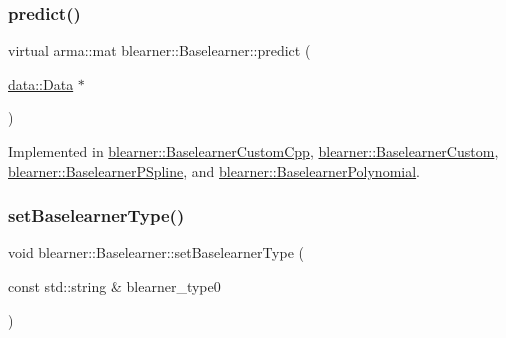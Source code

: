 \subsubsection{\texorpdfstring{predict()}{predict()}\hspace{0.1cm}{\footnotesize\ttfamily [2/2]}}
{\footnotesize\ttfamily virtual arma\+::mat blearner\+::\+Baselearner\+::predict (\begin{DoxyParamCaption}\item[{\hyperlink{classdata_1_1_data}{data\+::\+Data} $\ast$}]{ }\end{DoxyParamCaption})\hspace{0.3cm}{\ttfamily [pure virtual]}}



Implemented in \hyperlink{classblearner_1_1_baselearner_custom_cpp_a55fb45a929fea01f79fa3dcad7698174}{blearner\+::\+Baselearner\+Custom\+Cpp}, \hyperlink{classblearner_1_1_baselearner_custom_aeeb3a3934b94f095bfe689cff385dfa7}{blearner\+::\+Baselearner\+Custom}, \hyperlink{classblearner_1_1_baselearner_p_spline_a241485cc3e932c45564370a0881e3772}{blearner\+::\+Baselearner\+P\+Spline}, and \hyperlink{classblearner_1_1_baselearner_polynomial_a8aee40269b2b4dabdd81cebe5b4f2488}{blearner\+::\+Baselearner\+Polynomial}.

\mbox{\label{classblearner_1_1_baselearner_a8d78e851bae5f5b93dc46eb13d2d1ee1}} 
\subsubsection{\texorpdfstring{set\+Baselearner\+Type()}{setBaselearnerType()}}
{\footnotesize\ttfamily void blearner\+::\+Baselearner\+::set\+Baselearner\+Type (\begin{DoxyParamCaption}\item[{const std\+::string \&}]{blearner\+\_\+type0 }\end{DoxyParamCaption})}

